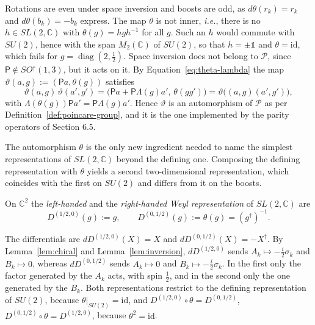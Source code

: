 \begin{remark}\label{rem:inversion-outer}
	Rotations are even under space inversion and boosts are odd, as $d\theta(r_k)=r_k$ and $d\theta(b_k)=-b_k$ express. The map $\theta$ is not inner, \textit{i.e.}, there is no $h\in SL(2,\mathbb{C})$ with $\theta(g)=hgh^{-1}$ for all $g$. Such an $h$ would commute with $SU(2)$, hence with the span $M_2(\mathbb{C})$ of $SU(2)$, so that $h=\pm\mathbb{1}$ and $\theta=\mathrm{id}$, which fails for $g=\operatorname{diag}(2,\tfrac12)$. Space inversion does not belong to $\mathcal{P}$, since $\mathsf{P}\notin SO^\uparrow(1,3)$, but it acts on it. By Equation~\eqref{eq:theta-lambda} the map $\vartheta(a,g):=(\mathsf{P}a,\theta(g))$ satisfies
	\begin{equation*}
		\vartheta(a,g)\,\vartheta(a',g')=\big(\mathsf{P}a+\mathsf{P}\Lambda(g)a',\,\theta(gg')\big)=\vartheta\big((a,g)(a',g')\big),
	\end{equation*}
	with $\Lambda(\theta(g))\mathsf{P}a'=\mathsf{P}\Lambda(g)a'$. Hence $\vartheta$ is an automorphism of $\mathcal{P}$ as per Definition~\ref{def:poincare-group}, and it is the one implemented by the parity operators of Section 6.5.
\end{remark}

The automorphism $\theta$ is the only new ingredient needed to name the simplest representations of $SL(2,\mathbb{C})$ beyond the defining one. Composing the defining representation with $\theta$ yields a second two-dimensional representation, which coincides with the first on $SU(2)$ and differs from it on the boosts.

\begin{definition}\label{def:weyl-spinors}
	On $\mathbb{C}^2$ the \emph{left-handed} and the \emph{right-handed Weyl representation} of $SL(2,\mathbb{C})$ are
	\begin{equation*}
		D^{(1/2,0)}(g):=g, \qquad D^{(0,1/2)}(g):=\theta(g)=(g^\dagger)^{-1}.
	\end{equation*}
\end{definition}

\begin{remark}\label{rem:weyl-differentials}
	The differentials are $dD^{(1/2,0)}(X)=X$ and $dD^{(0,1/2)}(X)=-X^\dagger$. By Lemma~\ref{lem:chiral} and Lemma~\ref{lem:inversion}, $dD^{(1/2,0)}$ sends $A_k\mapsto-\tfrac{i}{2}\sigma_k$ and $B_k\mapsto0$, whereas $dD^{(0,1/2)}$ sends $A_k\mapsto0$ and $B_k\mapsto-\tfrac{i}{2}\sigma_k$. In the first only the factor generated by the $A_k$ acts, with spin $\frac12$, and in the second only the one generated by the $B_k$. Both representations restrict to the defining representation of $SU(2)$, because $\theta|_{SU(2)}=\mathrm{id}$, and $D^{(1/2,0)}\circ\theta=D^{(0,1/2)}$, $D^{(0,1/2)}\circ\theta=D^{(1/2,0)}$, because $\theta^2=\mathrm{id}$.
\end{remark}

